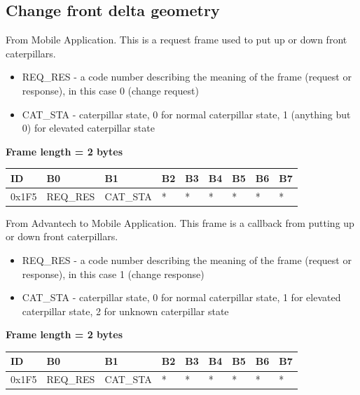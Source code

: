 \documentclass{article}
\begin{document}
\subsection{Change front delta geometry}
From Mobile Application. This is a request frame used to put up or down front caterpillars.

\begin{itemize}
    \item REQ\_RES - a code number describing the meaning of the frame (request or response), in this case 0 (change request)
    \item CAT\_STA - caterpillar state, 0 for normal caterpillar state, 1 (anything but 0) for elevated caterpillar state
\end{itemize}{}

\textbf{Frame length = 2 bytes}
\begin{center}
    \begin{tabular}{| p{20pt} | p{40pt} | p{40pt} | p{40pt} | p{40pt} | p{40pt} | p{40pt} | p{40pt} | p{40pt} |}
        \hline
        ID   & B0   & B1 & B2 & B3 & B4 & B5 & B6 & B7 \\
        \hline
        0x1F5 & REQ\_RES & CAT\_STA  & *  & *  & *  & *  & *  & *  \\
        \hline
    \end{tabular}
\end{center}

From Advantech to Mobile Application. This frame is a callback from putting up or down front caterpillars.

\begin{itemize}
    \item REQ\_RES - a code number describing the meaning of the frame (request or response), in this case 1 (change response)
    \item CAT\_STA - caterpillar state, 0 for normal caterpillar state, 1 for elevated caterpillar state, 2 for unknown caterpillar state
\end{itemize}{}

\textbf{Frame length = 2 bytes}
\begin{center}
    \begin{tabular}{| p{20pt} | p{40pt} | p{40pt} | p{40pt} | p{40pt} | p{40pt} | p{40pt} | p{40pt} | p{40pt} |}
        \hline
        ID   & B0   & B1 & B2 & B3 & B4 & B5 & B6 & B7 \\
        \hline
        0x1F5 & REQ\_RES & CAT\_STA  & *  & *  & *  & *  & *  & *  \\
        \hline
    \end{tabular}
\end{center}
\end{document}
